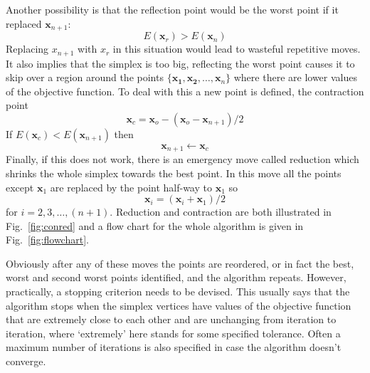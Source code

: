 \documentclass[12pt]{article}
\begin{document}
Another possibility is that the reflection point would be the worst
point if it replaced $\mathbf{x}_{n+1}$:
\begin{equation}
E(\mathbf{x}_r)>E(\mathbf{x}_n)
\end{equation}
Replacing $x_{n+1}$ with $x_r$ in this situation would lead to
wasteful repetitive moves. It also implies that the simplex is too
big, reflecting the worst point causes it to skip over a region around
the points $\{\mathbf{x_1},\mathbf{x_2},\ldots,\mathbf{x}_n\}$ where
there are lower values of the objective function. To deal with this a
new point is defined, the contraction point
\begin{equation}
\mathbf{x}_c=\mathbf{x}_o-(\mathbf{x}_o-\mathbf{x}_{n+1})/2
\end{equation}
If $E(\mathbf{x}_c)<E(\mathbf{x}_{n+1})$ then
\begin{equation}
\mathbf{x}_{n+1}\leftarrow \mathbf{x}_c
\end{equation}
Finally, if this does not work, there is an emergency move called
reduction which shrinks the whole simplex towards the best point. In
this move all the points except $\mathbf{x}_1$ are replaced by the
point half-way to $\mathbf{x}_1$ so
\begin{equation}
\mathbf{x}_i=(\mathbf{x}_i+\mathbf{x}_1)/2
\end{equation}
for $i=2,3,\ldots,(n+1)$. Reduction and contraction are both
illustrated in Fig.~\ref{fig:conred} and a flow chart for the whole
algorithm is given in Fig.~\ref{fig:flowchart}.

Obviously after any of these moves the points are reordered, or in
fact the best, worst and second worst points identified, and the
algorithm repeats. However, practically, a stopping criterion needs to
be devised. This usually says that the algorithm stops when the
simplex vertices have values of the objective function that are
extremely close to each other and are unchanging from iteration to
iteration, where \lq{}extremely\rq{} here stands for some specified
tolerance. Often a maximum number of iterations is also specified in
case the algorithm doesn't converge.
\end{document}
